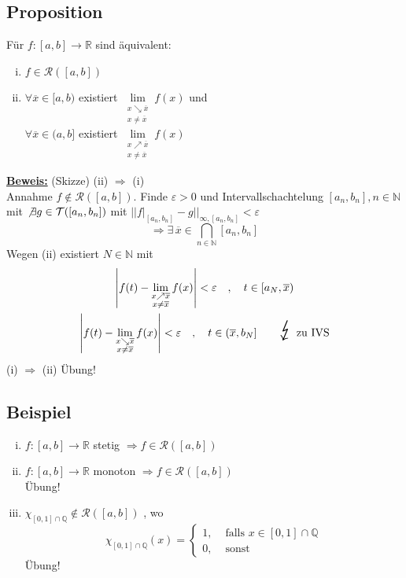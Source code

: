\subsection{Proposition} %
\label{sub:proposition}
Für $f : [a,b] \to \mathds{R}$ sind äquivalent:
\begin{enumerate}[(i)]
	\item $f \in \mathcal{R}( [a,b])$
	\item $\forall \overline{x} \in [a,b) $ existiert $\lim\limits_{\substack{x \searrow \overline{x} \\ x \not= \overline{x} }} f(x) $ und \\
	$\forall \overline{x} \in (a,b]$ existiert $\lim\limits_{\substack{x \nearrow \overline{x} \\ x \not= \overline{x} }} f(x)$
\end{enumerate}
\underline{\textbf{Beweis:}} (Skizze) (ii) $\Rightarrow$ (i)\\
Annahme $f \not\in \mathcal{R} ( [a,b]) $. Finde $\varepsilon > 0$ und Intervallschachtelung $[a_n , b_n] , n \in \mathds{N} $ mit 
$\not\exists g \in \mathcal{T} ( [a_n, b_n])$ mit $\Big|\Big| f \big|_{[a_n , b_n]} -  g\Big|\Big|_{\infty, [a_n, b_n]} < \varepsilon$
\[
	\Longrightarrow \exists \, \overline{x} \in \bigcap_{n \in \mathds{N}} [a_n, b_n]
\]
Wegen (ii) existiert $N \in \mathds{N}$ mit 
\begin{gather*}
	\left| f(t) - \lim\limits_{\substack{x \nearrow \overline{x} \\ x \not= \overline{x} }} f(x) \right| < \varepsilon \quad , \quad t \in [a_N , \overline{x} ) \\
	\left| f(t) - \lim\limits_{\substack{x \searrow \overline{x} \\ x \not= \overline{x} }} f(x) \right| < \varepsilon \quad , \quad t \in (\overline{x}  , b_N]
	\tag*{{\huge $\lightning$} zu IVS}
\end{gather*}
(i) $\Rightarrow $ (ii) Übung!

\subsection{Beispiel} %
\label{sub:beispiel}
\begin{enumerate}[(i)]
	\item $f : [a,b] \to \mathds{R}$ stetig $\Rightarrow f \in \mathcal{R} ( [a,b]) $
	\item $f : [a,b] \to \mathds{R}$ monoton $\Rightarrow f \in \mathcal{R} ([a,b]) $ \\
	Übung!
	\item $\chi_{[0,1] \cap \mathds{Q}} \not\in \mathcal{R}([a,b]) $ , wo 
	\[
		\chi_{[0,1] \cap \mathds{Q}} (x) = \begin{cases}
			1, &\text{ falls } x \in [0,1] \cap \mathds{Q}\\
			0 , &\text{ sonst }
		\end{cases}
	\]
	Übung!
\end{enumerate}

